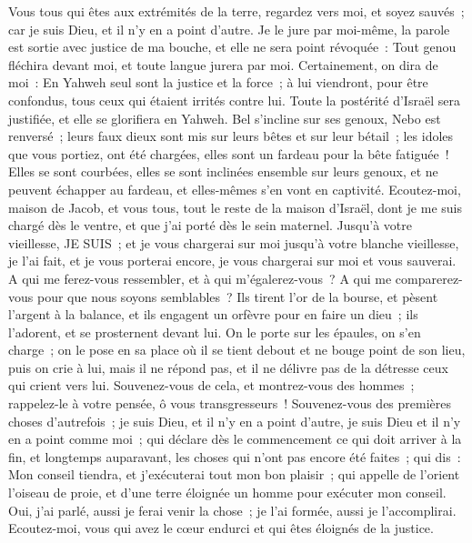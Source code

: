 \begin{multicols}{2}
Vous tous qui êtes aux extrémités de la terre, regardez vers moi, et soyez sauvés~; car je suis Dieu, et il n'y en a point d'autre.
Je le jure par moi-même, la parole est sortie avec justice de ma bouche, et elle ne sera point révoquée~: Tout genou fléchira devant moi, et toute langue jurera par moi.
Certainement, on dira de moi~: En Yahweh seul sont la justice et la force~; à lui viendront, pour être confondus, tous ceux qui étaient irrités contre lui.
Toute la postérité d'Israël sera justifiée, et elle se glorifiera en Yahweh.
\VerseOne{}Bel s'incline sur ses genoux, Nebo est renversé~; leurs faux dieux sont mis sur leurs bêtes et sur leur bétail~; les idoles que vous portiez, ont été chargées, elles sont un fardeau pour la bête fatiguée~!
Elles se sont courbées, elles se sont inclinées ensemble sur leurs genoux, et ne peuvent échapper au fardeau, et elles-mêmes s'en vont en captivité.
Ecoutez-moi, maison de Jacob, et vous tous, tout le reste de la maison d'Israël, dont je me suis chargé dès le ventre, et que j'ai porté dès le sein maternel.
Jusqu'à votre vieillesse, JE SUIS~; et je vous chargerai sur moi jusqu'à votre blanche vieillesse, je l'ai fait, et je vous porterai encore, je vous chargerai sur moi et vous sauverai.
A qui me ferez-vous ressembler, et à qui m'égalerez-vous~? A qui me comparerez-vous pour que nous soyons semblables~? 
Ils tirent l'or de la bourse, et pèsent l'argent à la balance, et ils engagent un orfèvre pour en faire un dieu~; ils l'adorent, et se prosternent devant lui.
On le porte sur les épaules, on s'en charge~; on le pose en sa place où il se tient debout et ne bouge point de son lieu, puis on crie à lui, mais il ne répond pas, et il ne délivre pas de la détresse ceux qui crient vers lui.
Souvenez-vous de cela, et montrez-vous des hommes~; rappelez-le à votre pensée, ô vous transgresseurs~!
Souvenez-vous des premières choses d'autrefois~; je suis Dieu, et il n'y en a point d'autre, je suis Dieu et il n'y en a point comme moi~;
qui déclare dès le commencement ce qui doit arriver à la fin, et longtemps auparavant, les choses qui n'ont pas encore été faites~; qui dis~: Mon conseil tiendra, et j'exécuterai tout mon bon plaisir~;
qui appelle de l'orient l'oiseau de proie, et d'une terre éloignée un homme pour exécuter mon conseil. Oui, j'ai parlé, aussi je ferai venir la chose~; je l'ai formée, aussi je l'accomplirai. 
Ecoutez-moi, vous qui avez le cœur endurci et qui êtes éloignés de la justice.

\end{multicols}
